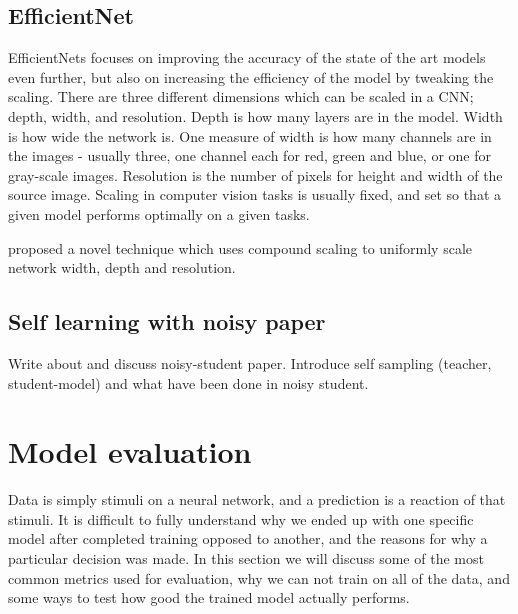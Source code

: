 \documentclass[thesis.tex]{subfiles}
\begin{document}
\subsection{EfficientNet}
EfficientNets \cite{EfficientNetRethinking19} focuses on improving the accuracy of the state of the art models even further, but also on increasing the efficiency of the model by tweaking the scaling. There are three different dimensions which can be scaled in a CNN; depth, width, and resolution. Depth is how many layers are in the model. Width is how wide the network is. One measure of width is how many channels are in the images - usually three, one  channel each for red, green and blue, or one for gray-scale images. Resolution is the number of pixels for height and width of the source image. Scaling in computer vision tasks is usually fixed, and set so that a given model performs optimally on a given tasks. 



\citeauthor*{EfficientNetRethinking19} proposed a novel technique which uses compound scaling to uniformly scale network width, depth and resolution.




\subsection{Self learning with noisy paper}
Write about and discuss noisy-student paper. Introduce self sampling (teacher, student-model) and what have been done in noisy student.





\section{Model evaluation}
Data is simply stimuli on a neural network, and a prediction is a reaction of that stimuli. It is difficult to fully understand why we ended up with one specific model after completed training opposed to another, and the reasons for why a particular decision was made. In this section we will discuss some of the most common metrics used for evaluation, why we can not train on all of the data, and some ways to test how good the trained model actually performs.
\end{document}
